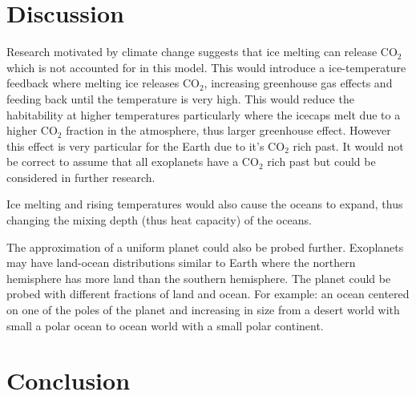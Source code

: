 \documentclass[12pt, onecolumn]{revtex4-2}    %
\begin{document}
\section{Discussion} \label{sec:Discussion}
Research motivated by climate change suggests that ice melting can release CO$_2$ which is not accounted for in this model.
This would introduce a ice-temperature feedback where melting ice releases CO$_2$, increasing greenhouse gas effects and feeding back until the temperature is very high.
This would reduce the habitability at higher temperatures particularly where the icecaps melt due to a higher CO$_2$ fraction in the atmosphere, thus larger greenhouse effect.
However this effect is very particular for the Earth due to it's CO$_2$ rich past.
It would not be correct to assume that all exoplanets have a CO$_2$ rich past but could be considered in further research.

Ice melting and rising temperatures would also cause the oceans to expand, thus changing the mixing depth (thus heat capacity) of the oceans.

The approximation of a uniform planet could also be probed further.
Exoplanets may have land-ocean distributions similar to Earth where the northern hemisphere has more land than the southern hemisphere.
The planet could be probed with different fractions of land and ocean.
For example: an ocean centered on one of the poles of the planet and increasing in size from a desert world with small a polar ocean to ocean world with a small polar continent.

\section{Conclusion} \label{sec:Conclusion}






\clearpage

\appendix
\end{document}
